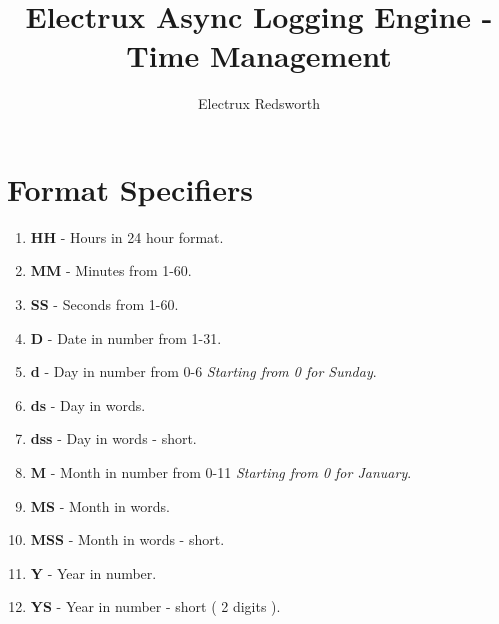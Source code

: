 \documentclass{article}
\author{Electrux Redsworth}
\title{Electrux Async Logging Engine - Time Management}
\begin{document}
\section{Format Specifiers}

\begin{enumerate}

\item \textbf{HH} - Hours in 24 hour format.
\item \textbf{MM} - Minutes from 1-60.
\item \textbf{SS} - Seconds from 1-60.

\item \textbf{D} - Date in number from 1-31.

\item \textbf{d} - Day in number from 0-6 \textit{Starting from 0 for Sunday}.
\item \textbf{ds} - Day in words.
\item \textbf{dss} - Day in words - short.

\item \textbf{M} - Month in number from 0-11 \textit{Starting from 0 for January}.
\item \textbf{MS} - Month in words.
\item \textbf{MSS} - Month in words - short.

\item \textbf{Y} - Year in number.
\item \textbf{YS} - Year in number - short ( 2 digits ).

\end{enumerate}
\end{document}
